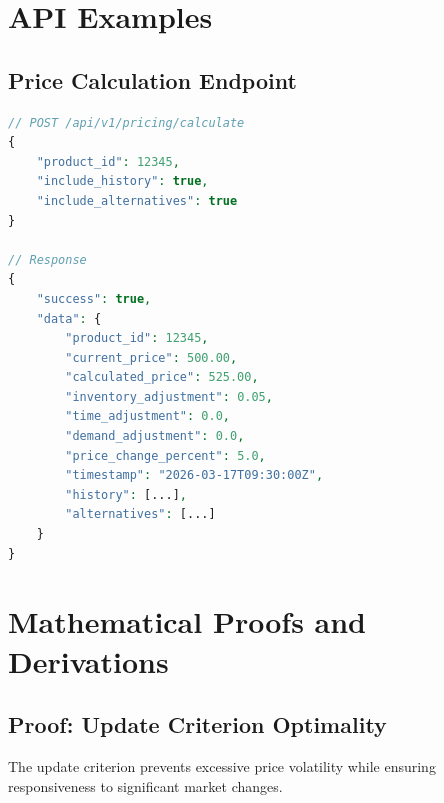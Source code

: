 \documentclass[12pt,a4paper,oneside]{report}
\begin{document}
\chapter{API Examples}

\section{Price Calculation Endpoint}

\begin{lstlisting}[language=PHP, caption=API Price Calculation]
// POST /api/v1/pricing/calculate
{
    "product_id": 12345,
    "include_history": true,
    "include_alternatives": true
}

// Response
{
    "success": true,
    "data": {
        "product_id": 12345,
        "current_price": 500.00,
        "calculated_price": 525.00,
        "inventory_adjustment": 0.05,
        "time_adjustment": 0.0,
        "demand_adjustment": 0.0,
        "price_change_percent": 5.0,
        "timestamp": "2026-03-17T09:30:00Z",
        "history": [...],
        "alternatives": [...]
    }
}
\end{lstlisting}

\chapter{Mathematical Proofs and Derivations}

\section{Proof: Update Criterion Optimality}

\begin{theorem}
The update criterion prevents excessive price volatility while ensuring responsiveness to significant market changes.
\end{theorem}
\end{document}
